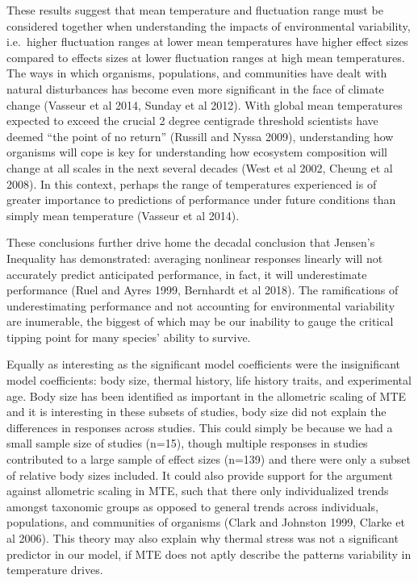 \documentclass[12pt,twoside]{reedthesis}
\begin{document}
These results suggest that mean temperature and fluctuation range must be considered together when understanding the impacts of environmental variability, i.e.~higher fluctuation ranges at lower mean temperatures have higher effect sizes compared to effects sizes at lower fluctuation ranges at high mean temperatures. The ways in which organisms, populations, and communities have dealt with natural disturbances has become even more significant in the face of climate change (Vasseur et al 2014, Sunday et al 2012). With global mean temperatures expected to exceed the crucial 2 degree centigrade threshold scientists have deemed ``the point of no return'' (Russill and Nyssa 2009), understanding how organisms will cope is key for understanding how ecosystem composition will change at all scales in the next several decades (West et al 2002, Cheung et al 2008). In this context, perhaps the range of temperatures experienced is of greater importance to predictions of performance under future conditions than simply mean temperature (Vasseur et al 2014).

These conclusions further drive home the decadal conclusion that Jensen's Inequality has demonstrated: averaging nonlinear responses linearly will not accurately predict anticipated performance, in fact, it will underestimate performance (Ruel and Ayres 1999, Bernhardt et al 2018). The ramifications of underestimating performance and not accounting for environmental variability are inumerable, the biggest of which may be our inability to gauge the critical tipping point for many species' ability to survive.

Equally as interesting as the significant model coefficients were the insignificant model coefficients: body size, thermal history, life history traits, and experimental age. Body size has been identified as important in the allometric scaling of MTE and it is interesting in these subsets of studies, body size did not explain the differences in responses across studies. This could simply be because we had a small sample size of studies (n=15), though multiple responses in studies contributed to a large sample of effect sizes (n=139) and there were only a subset of relative body sizes included. It could also provide support for the argument against allometric scaling in MTE, such that there only individualized trends amongst taxonomic groups as opposed to general trends across individuals, populations, and communities of organisms (Clark and Johnston 1999, Clarke et al 2006). This theory may also explain why thermal stress was not a significant predictor in our model, if MTE does not aptly describe the patterns variability in temperature drives.
\end{document}

